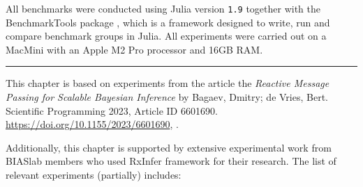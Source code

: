 All benchmarks were conducted using Julia version \texttt{1.9} together with the BenchmarkTools package \citep{chen_robust_2016}, which is a framework designed to write, run and compare benchmark groups in Julia.
All experiments were carried out on a MacMini with an Apple M2 Pro processor and 16GB RAM.

\par\noindent\rule{\textwidth}{0.5pt}

This chapter is based on experiments from the article the \textit{Reactive Message Passing for Scalable Bayesian Inference} by Bagaev, Dmitry; de Vries, Bert. Scientific Programming 2023, Article ID 6601690. \url{https://doi.org/10.1155/2023/6601690}, \citep{bagaev_reactive_2023}.

Additionally, this chapter is supported by extensive experimental work from BIASlab members who used RxInfer
framework for their research. The list of relevant experiments (partially) includes: 
